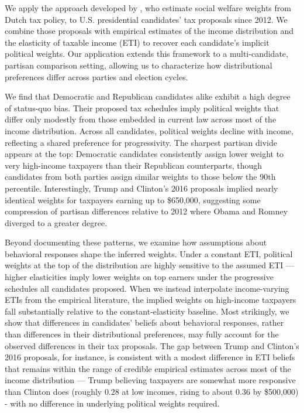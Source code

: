 \documentclass[12pt]{article}
\begin{document}
We apply the approach developed by \citet{JJZ2017}, who estimate social welfare weights from Dutch tax policy, to U.S. presidential candidates' tax proposals since 2012.  We combine those proposals with empirical estimates of the income distribution and the elasticity of taxable income (ETI) to recover each candidate's implicit political weights. Our application extends this framework to a multi-candidate, partisan comparison setting, allowing us to characterize how distributional preferences differ across parties and election cycles.

We find that Democratic and Republican candidates alike exhibit a high degree of status-quo bias. Their proposed tax schedules imply political weights that differ only modestly from those embedded in current law across most of the income distribution. Across all candidates, political weights decline with income, reflecting a shared preference for progressivity. The sharpest partisan divide appears at the top: Democratic candidates consistently assign lower weight to very high-income taxpayers than their Republican counterparts, though candidates from both parties assign similar weights to those below the 90th percentile. Interestingly, Trump and Clinton's 2016 proposals implied nearly identical weights for taxpayers earning up to \$650,000, suggesting some compression of partisan differences relative to 2012 where Obama and Romney diverged to a greater degree.

Beyond documenting these patterns, we examine how assumptions about behavioral responses shape the inferred weights. Under a constant ETI, political weights at the top of the distribution are highly sensitive to the assumed ETI — higher elasticities imply lower weights on top earners under the progressive schedules all candidates proposed. When we instead interpolate income-varying ETIs from the empirical literature, the implied weights on high-income taxpayers fall substantially relative to the constant-elasticity baseline. Most strikingly, we show that differences in candidates' beliefs about behavioral responses, rather than differences in their distributional preferences, may fully account for the observed differences in their tax proposals. The gap between Trump and Clinton's 2016 proposals, for instance, is consistent with a modest difference in ETI beliefs that remains within the range of credible empirical estimates across most of the income distribution — Trump believing taxpayers are somewhat more responsive than Clinton does (roughly $0.28$ at low incomes, rising to about $0.36$ by \$500,000) - with no difference in underlying political weights required.
\end{document}
